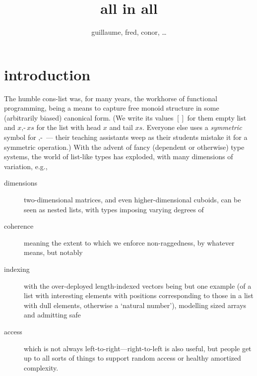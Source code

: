 \documentclass{article}
\begin{document}
\title{all in all}
\author{guillaume, fred, conor, \ldots}
\maketitle

\newcommand{\nil}{[]}
\newcommand{\cons}{\mbox{$,\!\textrm{-}$}}
\newcommand{\xs}{\mathit{xs}}
\newcommand{\ys}{\mathit{ys}}
\newcommand{\ps}{\mathit{ps}}
\newcommand{\qs}{\mathit{qs}}
\newcommand{\rs}{\mathit{rs}}
\newcommand{\D}{\mathbf}
\newcommand{\Ty}{\mathbf{Ty}}
\newcommand{\Li}{\D{List}}
\newcommand{\All}{\D{All}}
\newcommand{\Alll}{\D{Alll}}
\newcommand{\ListR}{\D{ListR}}
\newcommand{\Matrix}{\D{Matrix}}
\newcommand{\IF}{\;\Leftarrow\;}
\newcommand{\hb}{\!:\!}
\newcommand{\ma}{\mathbf{map}}
\newcommand{\fst}{\mathbf{fst}}
\newcommand{\sel}{\downharpoonleft}
\newcommand{\emp}{\varepsilon}

\section{introduction}

The humble cons-list was, for many years, the workhorse of functional programming, being a means to capture free monoid structure in some (arbitrarily biased) canonical form. (We write its values $\nil$ for them empty list and $x\cons\xs$ for the list with head $x$ and tail $\xs$. Everyone else uses a \emph{symmetric} symbol for $\cons$ --- their teaching assistants weep as their students mistake it for a symmetric operation.) With the advent of fancy (dependent or otherwise) type systems, the world of list-like types has exploded, with many dimensions of variation, e.g.,
\begin{description}
\item[dimensions] two-dimensional matrices, and even higher-dimensional cuboids, can be seen as nested lists, with types imposing varying degrees of
\item[coherence] meaning the extent to which we enforce non-raggedness, by whatever means, but notably
\item[indexing] with the over-deployed length-indexed vectors being but one example (of a list with interesting elements with positions corresponding to those in a list with dull elements, otherwise a `natural number'), modelling sized arrays and admitting safe
\item[access] which is not always left-to-right---right-to-left is also useful, but people get up to all sorts of things to support random access or healthy amortized complexity.
\end{description}
\end{document}
